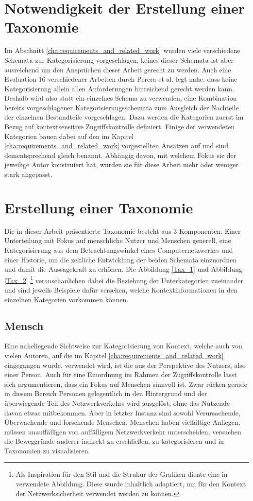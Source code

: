 \section{Notwendigkeit der Erstellung einer Taxonomie }
Im Abschnitt \ref{cha:requirements_and_related_work} wurden viele verschiedene Schemata zur Kategorisierung vorgeschlagen, keines dieser Schemata ist aber ausreichend um den Ansprüchen dieser Arbeit gerecht zu werden. Auch eine Evaluation 16 verschiedener Arbeiten durch Perera et al. \cite{perera_context_2014} legt nahe, dass keine Kategorisierung allein allen Anforderungen hinreichend gerecht werden kann.
Deshalb wird also statt ein einzelnes Schema zu verwenden, eine Kombination bereits vorgeschlagener Kategorisierungsschemata zum Ausgleich der Nachteile der einzelnen Bestandteile vorgeschlagen. Dazu werden die Kategorien zuerst im Bezug auf kontextsensitive Zugriffskontrolle definiert. Einige der verwendeten Kategorien bauen dabei auf den im Kapitel \ref{cha:requirements_and_related_work} vorgestellten Ansätzen auf und sind dementsprechend gleich benannt. Abhängig davon, mit welchem Fokus sie der jeweilige Autor konstruiert hat, wurden sie für diese Arbeit mehr oder weniger stark angepasst.
\section{Erstellung einer Taxonomie}
\label{sec:tax_erstellung}
Die in dieser Arbeit präsentierte Taxonomie besteht aus 3 Komponenten. Einer Unterteilung mit Fokus auf menschliche Nutzer und Menschen generell, eine Kategorisierung aus dem Betrachtungswinkel eines Computernetzwerkes und einer Historie, um die zeitliche Entwicklung der beiden Schemata einzuordnen und damit die Aussagekraft zu erhöhen.
Die Abbildung \ref{Tax_1} und Abbildung \ref{Tax_2} \footnote{Als Inspiration für den Stil und die Strukur der Grafiken diente eine in \cite{perera_context_2014} verwendete Abbildung. Diese wurde inhaltlich adaptiert, um für den Kontext der Netzwerksicherheit verwendet werden zu können.}  veranschaulichen dabei die Beziehung der Unterkategorien zueinander und sind jeweils Beispiele dafür versehen, welche Kontextinformationen in den einzelnen Kategorien vorkommen können. 
\subsection{Mensch}
Eine naheliegende Sichtweise zur Kategorisierung von Kontext, welche auch von vielen Autoren, auf die im Kapitel \ref{cha:requirements_and_related_work} eingegangen wurde, verwendet wird, ist die aus der Perspektive des Nutzers, also einer Person. Auch für eine Einordnung im Rahmen der Zugriffskontrolle lässt sich argumentieren, dass ein Fokus auf Menschen sinnvoll ist. Zwar rücken gerade in diesem Bereich Personen gelegentlich in den Hintergrund und der überwiegende Teil des Netzwerkverkehrs wird ausgelöst, ohne das Nutzende davon etwas mitbekommen. Aber in letzter Instanz sind sowohl Verursachende, Überwachende und forschende Menschen. Menschen haben vielfältige Anliegen, müssen unauffälligen von auffälligem Netzwerkverkehr unterscheiden, versuchen die Beweggründe anderer indirekt zu erschließen, zu kategorisieren und in Taxonomien zu visualisieren.

